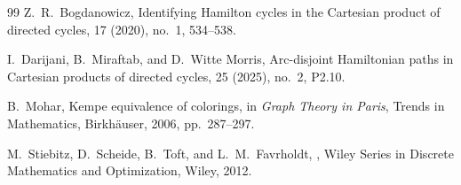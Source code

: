 \documentclass[11pt]{article}
\begin{document}
\begin{thebibliography}{99}
Z.~R.~Bogdanowicz,
\newblock Identifying Hamilton cycles in the Cartesian product of directed cycles,
 17 (2020), no.~1, 534--538.

I.~Darijani, B.~Miraftab, and D.~Witte Morris,
\newblock Arc-disjoint Hamiltonian paths in Cartesian products of directed cycles,
 25 (2025), no.~2, P2.10.

B.~Mohar,
\newblock Kempe equivalence of colorings,
\newblock in {\em Graph Theory in Paris}, Trends in Mathematics, Birkh\"auser, 2006, pp.~287--297.

M.~Stiebitz, D.~Scheide, B.~Toft, and L.~M.~Favrholdt,
,
\newblock Wiley Series in Discrete Mathematics and Optimization, Wiley, 2012.

\end{thebibliography}
\end{document}
